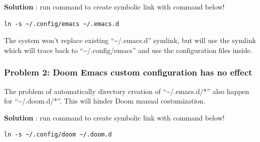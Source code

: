 \documentclass[11pt]{article}
\begin{document}
\textbf{Solution} : run command to create symbolic link with command below!
\begin{verbatim}
ln -s ~/.config/emacs ~/.emacs.d
\end{verbatim}
The system won't replace existing ``\textasciitilde{}/.emacs.d'' symlink, but will use the symlink which will trace back to ``\textasciitilde{}/.config/emacs'' and use the configuration files inside.
\subsubsection{Problem 2: Doom Emacs custom configuration has no effect}
\label{sec:org2ea60e8}
The problem of automatically directory creation of ``\textasciitilde{}/.emacs.d/*'' also happen for ``\textasciitilde{}/.doom.d/*''. This will hinder Doom manual costumization.

\textbf{Solution} : run command to create symbolic link with command below!
\begin{verbatim}
ln -s ~/.config/doom ~/.doom.d
\end{verbatim}
\end{document}
